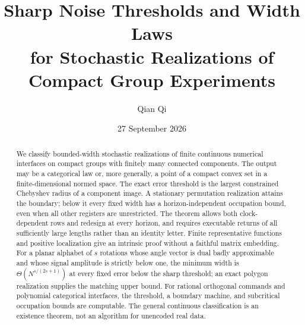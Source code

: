 \documentclass[11pt]{amsart}
\title[Noise thresholds and width laws]{Sharp Noise Thresholds and Width Laws\\for Stochastic Realizations of Compact Group Experiments}
\author{Qian Qi}
\date{27 September 2026}
\numberwithin{equation}{section}
\theoremstyle{definition}\newtheorem{definition}[theorem]{Definition}
\theoremstyle{remark}\newtheorem{remark}[theorem]{Remark}
\begin{document}
\begin{abstract}
We classify bounded-width stochastic realizations of finite continuous numerical interfaces on compact groups with finitely many connected components. The output may be a categorical law or, more generally, a point of a compact convex set in a finite-dimensional normed space. The exact error threshold is the largest constrained Chebyshev radius of a component image. A stationary permutation realization attains the boundary; below it every fixed width has a horizon-independent occupation bound, even when all other registers are unrestricted. The theorem allows both clock-dependent rows and redesign at every horizon, and requires executable returns of all sufficiently large lengths rather than an identity letter. Finite representative functions and positive localization give an intrinsic proof without a faithful matrix embedding. For a planar alphabet of $s$ rotations whose angle vector is dual badly approximable and whose signal amplitude is strictly below one, the minimum width is $\Theta(N^{s/(2s+1)})$ at every fixed error below the sharp threshold; an exact polygon realization supplies the matching upper bound. For rational orthogonal commands and polynomial categorical interfaces, the threshold, a boundary machine, and subcritical occupation bounds are computable. The general continuous classification is an existence theorem, not an algorithm for unencoded real data.
\end{abstract}
\maketitle








\end{document}
